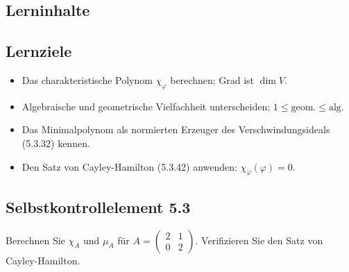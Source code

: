 \documentclass[a4paper,12pt]{article}
\begin{document}
\subsection*{Lerninhalte}
\begin{center}
\end{center}

\subsection*{Lernziele}
\begin{itemize}
  \item Das charakteristische Polynom $\chi_\varphi$ berechnen; Grad ist $\dim V$.
  \item Algebraische und geometrische Vielfachheit unterscheiden; $1 \le \text{geom.} \le \text{alg.}$
  \item Das Minimalpolynom als normierten Erzeuger des Verschwindungsideals (5.3.32) kennen.
  \item Den Satz von Cayley-Hamilton (5.3.42) anwenden: $\chi_\varphi(\varphi) = 0$.
\end{itemize}

\subsection*{Selbstkontrollelement 5.3}
Berechnen Sie $\chi_A$ und $\mu_A$ für $A = \begin{pmatrix}2&1\\0&2\end{pmatrix}$.
Verifizieren Sie den Satz von Cayley-Hamilton.
\end{document}
